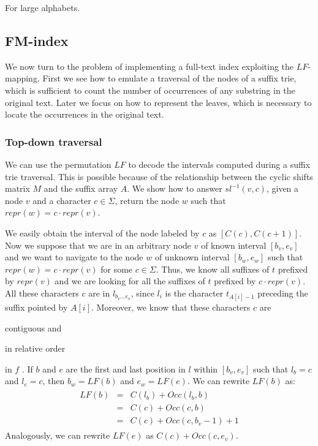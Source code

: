 For large alphabets.

\subsection{FM-index}

We now turn to the problem of implementing a full-text index exploiting the $LF$-mapping.
First we see how to emulate a traversal of the nodes of a suffix trie, which is sufficient to count the number of occurrences of any substring in the original text.
Later we focus on how to represent the leaves, which is necessary to locate the occurrences in the original text.

\label{sub:fmi}
\subsubsection{Top-down traversal}

We can use the permutation $LF$ to decode the intervals computed during a suffix trie traversal.
This is possible because of the relationship between the cyclic shifts matrix $M$ and the suffix array $A$.
We show how to answer $sl^{-1}(v,c)$, \ie given a node $v$ and a character $c \in \Sigma$, return the node $w$ such that $repr(w) = c \cdot repr(v)$.

We easily obtain the interval of the node labeled by $c$ as $[C(c),C(c+1)]$.
Now we suppose that we are in an arbitrary node $v$ of known interval $[b_v, e_v]$ and we want to navigate to the node $w$ of unknown interval $[b_w, e_w]$ such that $repr(w)=c \cdot repr(v)$ for some $c \in \Sigma$.
Thus, we know all suffixes of $t$ prefixed by $repr(v)$ and we are looking for all the suffixes of $t$ prefixed by $c \cdot repr(v)$.
All these characters $c$ are in $l_{b_v \dots e_v}$, since $l_i$ is the character $t_{A[i] - 1}$ preceding the suffix pointed by $A[i]$.
Moreover, we know that these characters $c$ are
\begin{inparaenum}[(i)]
\item contiguous and
\item in relative order
\end{inparaenum}
in $f$ \citep{Ferragina2000}.
If $b$ and $e$ are the first and last position in $l$ within $[b_v, e_v]$ such that $l_b = c$ and $l_e = c$, then $b_w = LF(b)$ and $e_w = LF(e)$.
We can rewrite $LF(b)$ as:
\begin{eqnarray}
\begin{array}{lcl}
LF(b) &=& C(l_b) + Occ(l_b, b)\\
 	  &=& C(c) + Occ(c, b)\\
	  &=& C(c) + Occ(c, b_v - 1) + 1
\end{array}
\end{eqnarray}
Analogously, we can rewrite $LF(e)$ as $C(c) + Occ(c, e_v)$.

